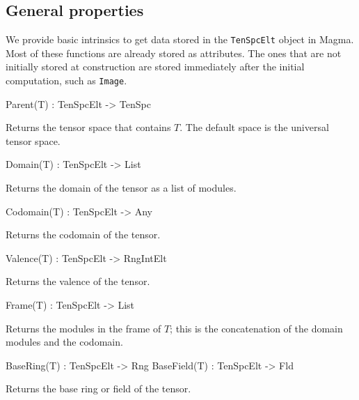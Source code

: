\subsection{General properties}

We provide basic intrinsics to get data stored in the {\tt TenSpcElt} object in Magma.
Most of these functions are already stored as attributes. 
The ones that are not initially stored at construction are stored immediately after the initial computation, such as {\tt Image}.

\begin{intrinsics}
Parent(T) : TenSpcElt -> TenSpc
\end{intrinsics}

Returns the tensor space that contains $T$. The default space is the universal 
tensor space.

\begin{intrinsics}
Domain(T) : TenSpcElt -> List
\end{intrinsics}

Returns the domain of the tensor as a list of modules.

\begin{intrinsics}
Codomain(T) : TenSpcElt -> Any
\end{intrinsics}

Returns the codomain of the tensor.

\begin{intrinsics}
Valence(T) : TenSpcElt -> RngIntElt
\end{intrinsics}

Returns the valence of the tensor.

\begin{intrinsics}
Frame(T) : TenSpcElt -> List
\end{intrinsics}

Returns the modules in the frame of $T$; this is the concatenation of
the domain modules and the codomain.

\begin{intrinsics}
BaseRing(T) : TenSpcElt -> Rng
BaseField(T) : TenSpcElt -> Fld
\end{intrinsics}

Returns the base ring or field of the tensor.

